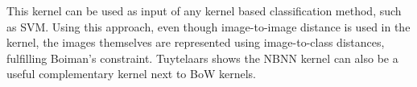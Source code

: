 This kernel can be used as input of any kernel based classification method, such as SVM. Using this approach, even though image-to-image distance is used in the kernel, the images themselves are represented using image-to-class distances, fulfilling Boiman's constraint. Tuytelaars shows the NBNN kernel can also be a useful complementary kernel next to BoW kernels.

